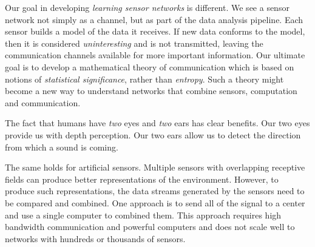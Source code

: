 \documentclass{article}
\begin{document}
Our goal in developing {\em learning sensor networks} is different. We see a sensor network not simply as a channel, but as part of the data analysis pipeline. Each sensor builds a model of the data it receives. If new data conforms to the model, then it is considered {\em uninteresting} and is not transmitted, leaving the communication channels available for more important information. Our ultimate goal is to develop a mathematical theory of communication which is based on notions of {\em statistical significance}, rather than {\em entropy}. Such a theory might become a new way to understand networks that combine sensors, computation and communication.

\iffalse
Thus, we will develop new techniques for designing the geometry of sensor networks in a way that maximizes their ability to perform their requisite data-processing task while minimizing their communication. For this, we will use and develop methods from Sparse linear arrays such as co-prime and nested arrays.
We will use the array to localize and identify weak sounds and extract information about the environment. We will use graph theoretic ideas to guide our design and analysis of communication protocols among sensors. We will design and analyze computationally efficient binary sketches that sufficiently summarize the data collected at each sensor. This will allow the sensors to efficiently collaborate to perform various statistical tasks including, for example, change-point detection, correlation analysis, and two-sample tests, using kernel methods. For this, we will use and develop methods in applied harmonic analysis, high dimensional probability, and machine learning. 
\fi






\iffalse The fact that humans have {\em two} eyes and {\em two} ears has clear
benefits. Our two eyes provide us with depth perception. Our two ears
allow us to detect the direction from which a sound is coming.

The same holds for artificial sensors. Multiple sensors with
overlapping receptive fields can produce better representations of the
environment. However, to produce such representations, the data
streams generated by the sensors need to be compared and combined. One
approach is to send all of the signal to a center and use a single
computer to combined them. This approach requires high bandwidth
communication and powerful computers and does not scale well to
networks with hundreds or thousands of sensors.
\end{document}
